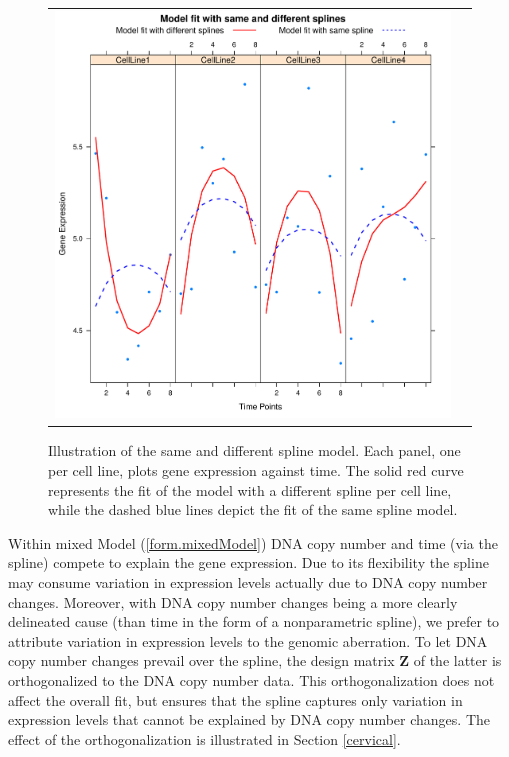 \begin{figure}[h!]
\centering
\begin{tabular}{cc} 
\includegraphics[scale=0.55]{Figure1.pdf}
\end{tabular}
\caption{Illustration of the same and different spline model. Each panel, one
 per cell line, plots gene expression against time. The solid red curve represents
 the fit of the model with a different spline per cell line, while the dashed blue
 lines depict the fit of the same spline model.}
\label{fig:sameDiffSpl}
\end{figure}

Within mixed Model (\ref{form.mixedModel}) DNA copy number and time (via the spline) compete to explain the gene expression. Due to its flexibility the spline may consume variation in expression levels actually due to DNA copy number changes. Moreover, with DNA copy number changes being a more clearly delineated cause (than time in the form of a nonparametric spline), we prefer to attribute variation in expression levels to the genomic aberration. To let DNA copy number changes prevail over the spline, the design matrix $\mathbf{Z}$ of the latter is orthogonalized to the DNA copy number data. This orthogonalization does not affect the overall fit, but ensures that the spline captures only variation in expression levels that cannot be explained by DNA copy number changes. The effect of the orthogonalization is illustrated in Section \ref{cervical}.

